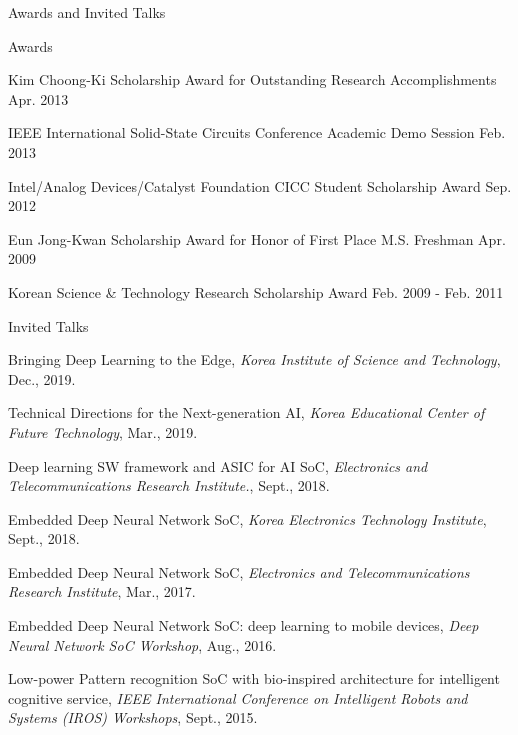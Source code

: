 \documentclass{resume} %
\begin{document}
\begin{section}{Awards and Invited Talks}

\begin{subsection}{Awards}{}{}{}
\item Kim Choong-Ki Scholarship Award for Outstanding Research Accomplishments \hfill Apr. 2013
\item IEEE International Solid-State Circuits Conference Academic Demo Session \hfill Feb. 2013
\item Intel/Analog Devices/Catalyst Foundation CICC Student Scholarship Award \hfill Sep. 2012
\item Eun Jong-Kwan Scholarship Award for Honor of First Place M.S. Freshman \hfill Apr. 2009
\item Korean Science \& Technology Research Scholarship Award \hfill Feb. 2009 - Feb. 2011
\end{subsection}

\begin{subsection}{Invited Talks}{}{}{}

\item Bringing Deep Learning to the Edge,
{\small\textit{Korea Institute of Science and Technology}, Dec., 2019.}

\item Technical Directions for the Next-generation AI,
{\small\textit{Korea Educational Center of Future Technology}, Mar., 2019.}

\item Deep learning SW framework and ASIC for AI SoC,
{\small\textit{Electronics and Telecommunications Research Institute.}, Sept., 2018.}

\item Embedded Deep Neural Network SoC,
{\small\textit{Korea Electronics Technology Institute}, Sept., 2018.}

\item Embedded Deep Neural Network SoC,
{\small\textit{Electronics and Telecommunications Research Institute}, Mar., 2017.}

\item Embedded Deep Neural Network SoC:  deep learning to mobile devices,
{\small\textit{Deep Neural Network SoC Workshop}, Aug., 2016.}

\item Low-power Pattern recognition SoC with bio-inspired architecture for intelligent cognitive service,
{\small\textit{IEEE International Conference on Intelligent Robots and Systems (IROS) Workshops}, Sept., 2015.}


\end{subsection}
\end{section}
\end{document}
